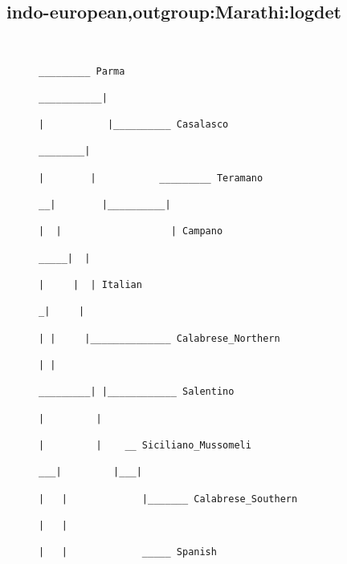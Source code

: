 \subsection{indo-european,outgroup:Marathi:logdet}
\begin{figure}[H]
\begin{center}
{
\selectfont
\begin{verbatim}

                                                                                                                             _________ Parma
                                                                                                                 ___________|
                                                                                                                |           |__________ Casalasco
                                                                                                        ________|
                                                                                                       |        |           _________ Teramano
                                                                                                     __|        |__________|
                                                                                                    |  |                   | Campano
                                                                                               _____|  |
                                                                                              |     |  | Italian
                                                                                             _|     |
                                                                                            | |     |______________ Calabrese_Northern
                                                                                            | |
                                                                                   _________| |____________ Salentino
                                                                                  |         |
                                                                                  |         |    __ Siciliano_Mussomeli
                                                                               ___|         |___|
                                                                              |   |             |_______ Calabrese_Southern
                                                                              |   |
                                                                              |   |             _____ Spanish

\end{verbatim}}
\end{center}
\end{figure}
